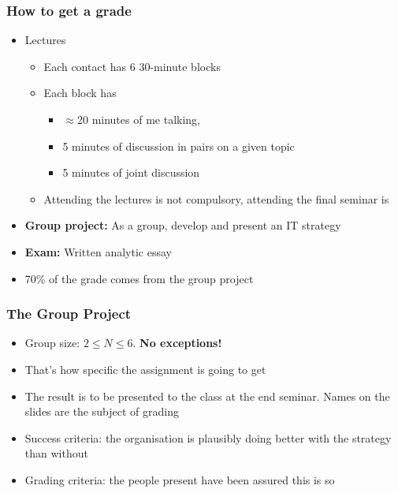 \begin{frame}[fragile]
  \frametitle{How to get a grade}
	\begin{itemize}
	\item Lectures
	\begin{itemize}
		\item Each contact has 6 30-minute blocks
		\item Each block has 
		\begin{itemize}
				\item $\approx$20 minutes of me talking, 
				\item 5 minutes of discussion in pairs on a given topic
				\item 5 minutes of joint discussion
		\end{itemize}
		\item Attending the lectures is not compulsory, attending the final seminar is
	\end{itemize}
	\item \textbf{Group project:} As a group, develop and present an IT strategy 
	\item \textbf{Exam:} Written analytic essay
	\item 70\% of the grade comes from the group project
	\end{itemize}
\end{frame}

\begin{frame}[fragile]
  \frametitle{The Group Project}
  	\begin{itemize}
		\item Group size: $2\leq N\leq6$. \textbf{No exceptions!}
		\item That's how specific the assignment is going to get
		\item The result is to be presented to the class at the end seminar. Names on the slides are the subject of grading
		\item Success criteria: the organisation is plausibly doing better with the strategy than without
		\item Grading criteria: the people present have been assured this is so
	\end{itemize}
\end{frame}

